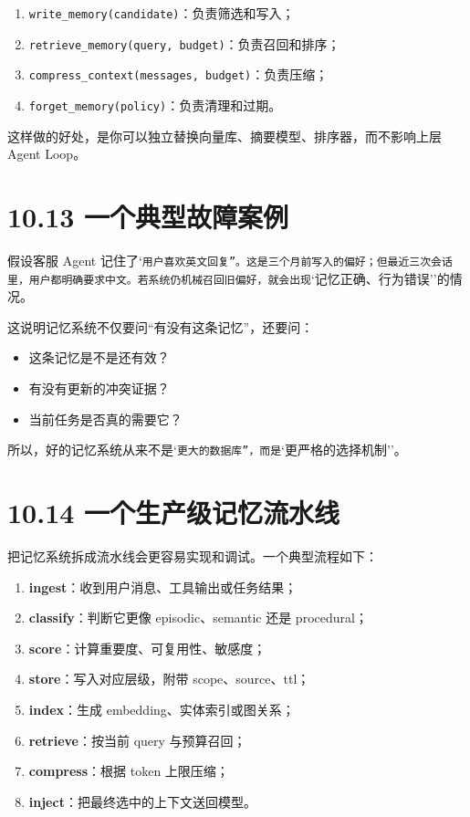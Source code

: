 \begin{enumerate}[leftmargin=2em]
\item \texttt{write\_memory(candidate)}：负责筛选和写入；
\item \texttt{retrieve\_memory(query, budget)}：负责召回和排序；
\item \texttt{compress\_context(messages, budget)}：负责压缩；
\item \texttt{forget\_memory(policy)}：负责清理和过期。
\end{enumerate}

这样做的好处，是你可以独立替换向量库、摘要模型、排序器，而不影响上层 Agent Loop。


\section{10.13 一个典型故障案例}

假设客服 Agent 记住了`\texttt{用户喜欢英文回复''。这是三个月前写入的偏好；但最近三次会话里，用户都明确要求中文。若系统仍机械召回旧偏好，就会出现}`记忆正确、行为错误''的情况。


这说明记忆系统不仅要问``有没有这条记忆''，还要问：


\begin{itemize}[leftmargin=2em]
\item 这条记忆是不是还有效？
\item 有没有更新的冲突证据？
\item 当前任务是否真的需要它？
\end{itemize}

所以，好的记忆系统从来不是`\texttt{更大的数据库''，而是}`更严格的选择机制''。


\section{10.14 一个生产级记忆流水线}

把记忆系统拆成流水线会更容易实现和调试。一个典型流程如下：


\begin{enumerate}[leftmargin=2em]
\item \textbf{ingest}：收到用户消息、工具输出或任务结果；
\item \textbf{classify}：判断它更像 episodic、semantic 还是 procedural；
\item \textbf{score}：计算重要度、可复用性、敏感度；
\item \textbf{store}：写入对应层级，附带 scope、source、ttl；
\item \textbf{index}：生成 embedding、实体索引或图关系；
\item \textbf{retrieve}：按当前 query 与预算召回；
\item \textbf{compress}：根据 token 上限压缩；
\item \textbf{inject}：把最终选中的上下文送回模型。
\end{enumerate}

